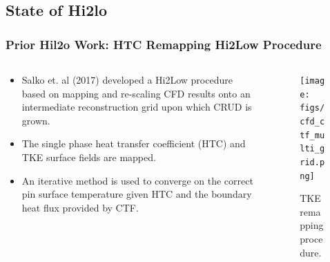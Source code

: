 \documentclass[t, pdftex]{beamer}
\begin{document}
\subsection*{State of Hi2lo}
\begin{frame}[shrink=10]
\frametitle{Prior Hil2o Work: HTC Remapping Hi2Low Procedure}
\begin{columns}
    \begin{column}{0.5\textwidth}
        \begin{itemize}
            \item Salko et. al (2017)  developed a Hi2Low procedure based on mapping and re-scaling CFD results onto an intermediate reconstruction grid upon which CRUD is grown.
            \item The single phase heat transfer coefficient (HTC) and TKE surface fields are mapped.
            \item An iterative method is used to converge on the correct pin surface temperature given HTC and the boundary heat flux provided by CTF.
        \end{itemize}
    \end{column}
    \begin{column}{0.5\textwidth}  %
        \begin{center}
            \begin{figure}
                \texttt{[image: figs/cfd\_ctf\_multi\_grid.png]}
                \caption{\centering TKE remapping procedure. \cite{salko17}}      
            \end{figure}
        \end{center}
    \end{column}
\end{columns}
\vspace{-12pt}
\end{frame}

\end{document}
